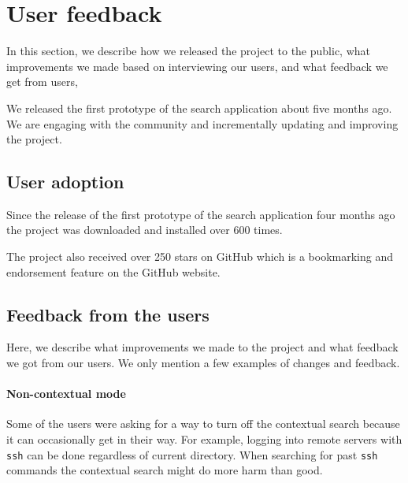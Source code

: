 


\section{User feedback}

In this section, we describe how we released the project to the public, what improvements we made based on interviewing our users, and what feedback we get from users,

We released the first prototype of the search application about five months ago. We are engaging with the community and incrementally updating and improving the project. 

\subsection{User adoption}

Since the release of the first prototype of the search application four months ago the project was downloaded and installed over 600 times. 

The project also received over 250 stars on GitHub which is a bookmarking and endorsement feature on the GitHub website.\cite{github-stars}



\subsection{Feedback from the users}

Here, we describe what improvements we made to the project and what feedback we got from our users. We only mention a few examples of changes and feedback.

\paragraph{Non-contextual mode}

Some of the users were asking for a way to turn off the contextual search because it can occasionally get in their way. For example, logging into remote servers with \verb|ssh| can be done regardless of current directory. When searching for past \verb|ssh| commands the contextual search might do more harm than good.

